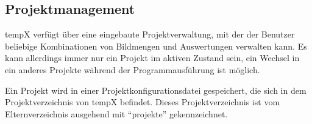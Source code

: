 \subsection{Projektmanagement}

\label{subsec:projektmanagement}
	
	\gls{tempX} verfügt über eine eingebaute Projektverwaltung, mit der der Benutzer beliebige Kombinationen von Bildmengen und Auswertungen verwalten kann. Es kann allerdings immer nur ein Projekt im aktiven Zustand sein, ein Wechsel in ein anderes Projekte während der Programmausführung ist möglich.\par Ein Projekt wird in einer Projektkonfigurationsdatei gespeichert, die sich in dem Projektverzeichnis von \gls{tempX} befindet. Dieses Projektverzeichnis ist vom Elternverzeichnis ausgehend mit "`projekte"' gekennzeichnet.
	
